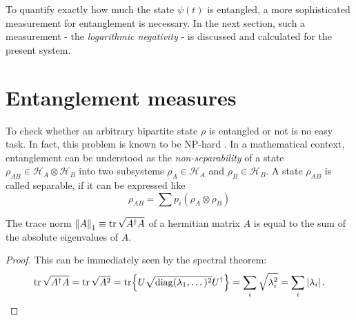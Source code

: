 To quantify exactly how much the state $\psi(t)$ is entangled, a more sophisticated measurement for entanglement is necessary. In the next section, such a measurement - the \emph{logarithmic negativity} - is discussed and calculated for the present system.



\section{Entanglement measures}
To check whether an arbitrary bipartite state $\rho$ is entangled or not is no easy task. In fact, this problem is known to be NP-hard \cite{Gurvits_2003}.
In a mathematical context, entanglement can be understood as the \emph{non-separability} of a state $\rho_{AB} \in \mathcal{H}_A \otimes \mathcal{H}_B$ into two subsystems $\rho_A \in \mathcal{H}_A$ and $\rho_B \in \mathcal{H}_B$.
A state $\rho_{AB}$ is called separable, if it can be expressed like
\begin{equation}
  \rho_{AB} = \sum p_i (\rho_A \otimes \rho_B)
\end{equation}





\begin{lemma}\label{lemma:trace-norm-hermitian}
  The trace norm $\left\lVert A\right\rVert_1 \equiv \tr \sqrt{A^\dagger A}$ of a hermitian matrix $A$ is equal to the sum of the absolute eigenvalues of $A$.
\end{lemma}
\begin{proof}
  This can be immediately seen by the spectral theorem:
  \begin{equation*}
    \tr \sqrt{A^\dagger A} = \tr \sqrt{A^2} = \tr{U\sqrt{\operatorname{diag}(\lambda_1, \dots)^2}U^\dagger} = \sum_i \sqrt{\lambda_i^2} = \sum_i \left\lvert\lambda_i\right\rvert.
  \end{equation*}
\end{proof}

